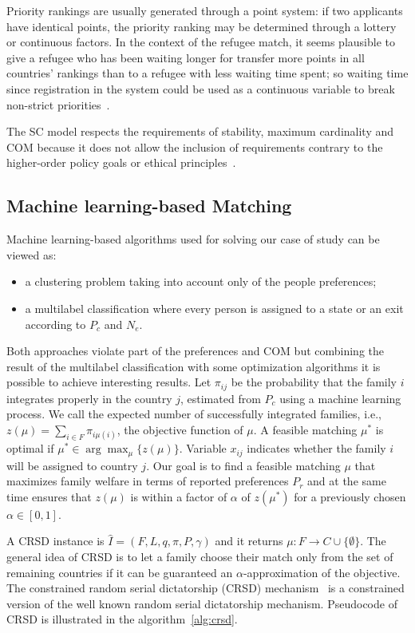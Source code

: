 Priority rankings are usually generated through a point system: if two applicants have identical points, the priority ranking may be determined through a lottery or continuous factors.
In the context  of the refugee match, it seems plausible to give a refugee who has been waiting longer for transfer  more points in all countries’ rankings than to a refugee with less waiting time spent;
so waiting time since registration in the system could be used as a continuous variable to break non-strict priorities~\cite{basshuysen}.

The SC model respects the requirements of stability, maximum cardinality and COM because it does not allow the inclusion of requirements contrary to the higher-order policy goals or ethical principles~\cite{basshuysen}.


\subsection{Machine learning-based Matching}\label{machine-learning-based-matching}%
Machine learning-based algorithms used for solving our case of study can be viewed as:
\begin{itemize}
    \item a clustering problem taking into account only of the people preferences;
    \item a multilabel classification where every person is assigned to a state or an exit according to \(P_c\) and \(N_e\).
\end{itemize}
Both approaches violate part of the preferences and COM but combining the result of the multilabel classification with some optimization algorithms it is possible to achieve interesting results.
Let \(\pi_{ij}\) be the probability that the family \(i\) integrates properly in the country \(j\), estimated from \(P_c\) using a machine learning process.
We call the expected number of successfully integrated families, i.e., \(z (\mu) = \sum_{i \in F} \pi_{i \mu (i)}\), the objective function of \(\mu\). A feasible matching \(\mu^*\) is optimal if \(\mu^* \in \arg\max_{\mu} \{z (\mu)\}\).
Variable \(x_{ij}\) indicates whether the family \(i\) will be assigned to country \(j\).
Our goal is to find a feasible matching \(\mu\) that maximizes family welfare in terms of reported preferences \(P_r\) and at the same time ensures that \(z (\mu)\) is within a factor of \(\alpha\) of \(z \left( \mu^* \right) \) for a previously chosen \(\alpha \in [0,1]\).

A CRSD instance is \(\hat {I} = (F, L, q, \pi, P, \gamma)\) and it returns \(\mu : F \rightarrow C \cup \{\emptyset\}\).
The general idea of CRSD is to let a family choose their match only from the set of remaining countries if it can be guaranteed an \(\alpha\)-approximation of the objective.
The constrained random serial dictatorship (CRSD) mechanism~\cite{bansak_2018} is a constrained version of the well known random serial dictatorship mechanism.
Pseudocode of CRSD is illustrated in the algorithm~\ref{alg:crsd}.

